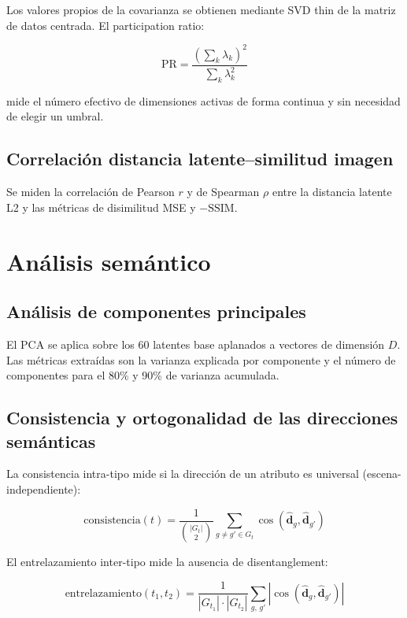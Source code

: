 \documentclass[12pt, a4paper, twoside]{book}
\begin{document}
Los valores propios de la covarianza se obtienen mediante SVD thin de la matriz de datos centrada. El participation ratio:

\begin{equation}
\text{PR} = \frac{\left(\sum_k \lambda_k\right)^2}{\sum_k \lambda_k^2}
\end{equation}

mide el número efectivo de dimensiones activas de forma continua y sin necesidad de elegir un umbral.

\subsection{Correlación distancia latente--similitud imagen}

Se miden la correlación de Pearson $r$ y de Spearman $\rho$ entre la distancia latente L2 y las métricas de disimilitud MSE y $-\text{SSIM}$.

\section{Análisis semántico}
\label{sec:metodos:semantico}

\subsection{Análisis de componentes principales}

El PCA se aplica sobre los 60 latentes base aplanados a vectores de dimensión $D$. Las métricas extraídas son la varianza explicada por componente y el número de componentes para el 80\% y 90\% de varianza acumulada.

\subsection{Consistencia y ortogonalidad de las direcciones semánticas}

La consistencia intra-tipo mide si la dirección de un atributo es universal (escena-independiente):

\begin{equation}
\text{consistencia}(t) = \frac{1}{\binom{|G_t|}{2}} \sum_{g \neq g' \in G_t} \cos\!\left(\hat{\mathbf{d}}_g, \hat{\mathbf{d}}_{g'}\right)
\end{equation}

El entrelazamiento inter-tipo mide la ausencia de disentanglement:

\begin{equation}
\text{entrelazamiento}(t_1, t_2) = \frac{1}{|G_{t_1}| \cdot |G_{t_2}|}
\sum_{g,\, g'} \left|\cos\!\left(\hat{\mathbf{d}}_g, \hat{\mathbf{d}}_{g'}\right)\right|
\end{equation}
\end{document}
